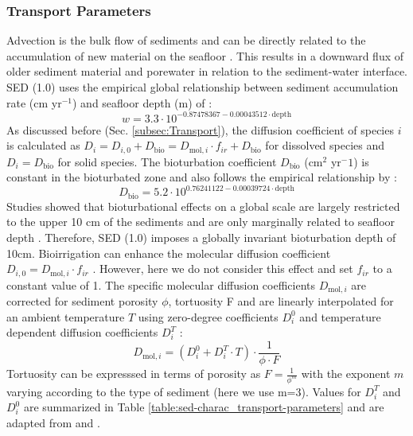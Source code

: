\documentclass[gmd, manuscript]{copernicus}
\begin{document}
\subsubsection{Transport Parameters}
Advection is the bulk flow of sediments and can be directly related to the accumulation of new material on the seafloor \citep[i.e. sedimentation,][]{burdige2006geochemistry}. 
This results in a downward flux of older sediment material and porewater in relation to the sediment-water interface. SED (1.0) uses the empirical global relationship between 
sediment accumulation rate (cm yr$^{-1}$) and seafloor depth (m) of \citet{middelburg_empirical_1997}: 
\begin{equation}
 w = 3.3\cdot 10^{-0.87478367-0.00043512\cdot \text{depth}}\label{eq:sedimentation_rate}
\end{equation}
As discussed before (Sec. \ref{subsec:Transport}), the diffusion coefficient of species $i$ is calculated as $D_i=D_{i,0}+D_{\mathrm{bio}}=D_{\mathrm{mol},i}\cdot f_{ir}+D_{\mathrm{bio}}$ for dissolved species and $D_i=D_{\mathrm{bio}}$ for solid species. 
The bioturbation coefficient $D_{\mathrm{bio}}$ (cm$^2$ yr$^-1$) is constant in the bioturbated zone and also follows the empirical relationship by \citet{middelburg_empirical_1997}:
\begin{equation}
 D_{\mathrm{bio}} = 5.2\cdot 10^{0.76241122-0.00039724\cdot \text{depth}}\label{eq:bioturbation_coeff}
\end{equation}
Studies showed that bioturbational effects on a global scale are largely restricted to the upper 10 cm of the sediments and are only marginally related to seafloor depth \citep[e.g.][]{boudreau_mean_1998, teal_global_2010}. 
Therefore, SED (1.0) imposes a globally invariant bioturbation depth of 10cm. 
Bioirrigation can enhance the molecular diffusion coefficient $D_{i,0}=D_{\mathrm{mol},i}\cdot f_{ir}$ \citep{soetaert1996dynamic}. However, here we do not consider this effect 
and set $f_{ir}$ to a constant value of 1. The specific molecular diffusion coefficients $D_{\mathrm{mol},i}$ are corrected for sediment porosity $\phi$, tortuosity F and are linearly interpolated for an ambient temperature $T$ using zero-degree 
coefficients $D^0_i$ and temperature dependent diffusion coefficients $D^T_i$ \citep[compare ][]{gypens_simple_2008}:
\begin{equation*}
 D_{\mathrm{mol},i} = (D^0_i + D^T_i \cdot T )\cdot \frac{1}{\phi\cdot F}
\end{equation*}
Tortuosity can be expresssed in terms of porosity as $F = \frac{1}{\phi^m}$ \citep{ullman_diffusion_1982} with the exponent $m$ varying according to the type of sediment (here we use m=3). 
Values for $D^T_i$ and $D^0_i$ are summarized in Table \ref{table:sed-charac_transport-parameters} and are adapted from \citet{Li_diffusion_1974} and \citet{gypens_simple_2008}.
\end{document}
